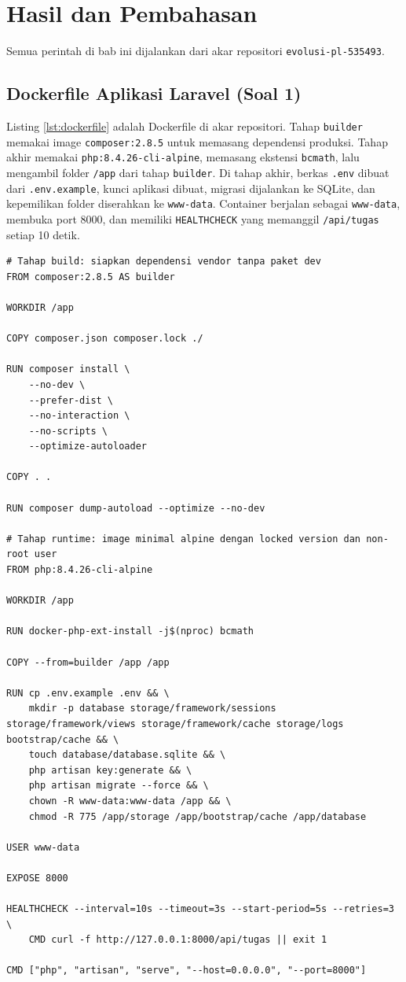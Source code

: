 \documentclass[a4paper,oneside,12pt]{report}
\newcommand{\tocboldsection}[1]{%
  \protect\renewcommand{\protect\cftchapfont}{\protect\bfseries}%
  #1%
  \protect\renewcommand{\protect\cftchapfont}{}%
}
\begin{document}
\clearpage

\chapter[\texorpdfstring{\tocboldsection{Hasil dan Pembahasan}}{Hasil dan Pembahasan}]{Hasil dan Pembahasan}

Semua perintah di bab ini dijalankan dari akar repositori \texttt{evolusi-pl-535493}.

\section{Dockerfile Aplikasi Laravel (Soal 1)}
Listing \ref{lst:dockerfile} adalah Dockerfile di akar repositori. Tahap \texttt{builder} memakai image \texttt{composer:2.8.5} untuk memasang dependensi produksi. Tahap akhir memakai \texttt{php:8.4.26-cli-alpine}, memasang ekstensi \texttt{bcmath}, lalu mengambil folder \texttt{/app} dari tahap \texttt{builder}. Di tahap akhir, berkas \texttt{.env} dibuat dari \texttt{.env.example}, kunci aplikasi dibuat, migrasi dijalankan ke SQLite, dan kepemilikan folder diserahkan ke \texttt{www-data}. Container berjalan sebagai \texttt{www-data}, membuka port 8000, dan memiliki \texttt{HEALTHCHECK} yang memanggil \texttt{/api/tugas} setiap 10 detik.

\begin{lstlisting}[style=dockerstyle,caption={\texttt{Dockerfile} pada repositori \texttt{evolusi-pl-535493}.},label={lst:dockerfile}]
# Tahap build: siapkan dependensi vendor tanpa paket dev
FROM composer:2.8.5 AS builder

WORKDIR /app

COPY composer.json composer.lock ./

RUN composer install \
    --no-dev \
    --prefer-dist \
    --no-interaction \
    --no-scripts \
    --optimize-autoloader

COPY . .

RUN composer dump-autoload --optimize --no-dev

# Tahap runtime: image minimal alpine dengan locked version dan non-root user
FROM php:8.4.26-cli-alpine

WORKDIR /app

RUN docker-php-ext-install -j$(nproc) bcmath

COPY --from=builder /app /app

RUN cp .env.example .env && \
    mkdir -p database storage/framework/sessions storage/framework/views storage/framework/cache storage/logs bootstrap/cache && \
    touch database/database.sqlite && \
    php artisan key:generate && \
    php artisan migrate --force && \
    chown -R www-data:www-data /app && \
    chmod -R 775 /app/storage /app/bootstrap/cache /app/database

USER www-data

EXPOSE 8000

HEALTHCHECK --interval=10s --timeout=3s --start-period=5s --retries=3 \
    CMD curl -f http://127.0.0.1:8000/api/tugas || exit 1

CMD ["php", "artisan", "serve", "--host=0.0.0.0", "--port=8000"]
\end{lstlisting}
\end{document}
